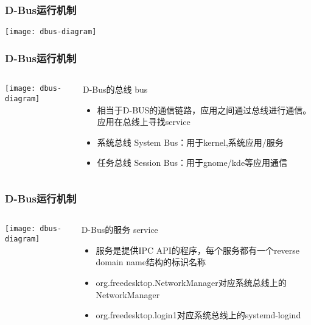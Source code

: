 \begin{frame}[plain]
	\frametitle{D-Bus运行机制}
	\centering
				\texttt{[image: dbus-diagram]}

\end{frame}
\begin{frame}[fragile]
	\frametitle{D-Bus运行机制}
	
	\begin{columns}
		\begin{column}{.4\textwidth}
			
			\texttt{[image: dbus-diagram]}
			
		\end{column}
		\begin{column}{.6\textwidth}
			D-Bus的总线 bus
			\begin{itemize}
				\item 相当于D-BUS的通信链路，应用之间通过总线进行通信。应用在总线上寻找service
				\item 系统总线 System Bus：用于kernel,系统应用/服务
				\item 任务总线 Session Bus：用于gnome/kde等应用通信
				
			\end{itemize}
		\end{column}
	\end{columns}
\end{frame}

\begin{frame}[fragile]
	\frametitle{D-Bus运行机制}
	
	\begin{columns}
		\begin{column}{.4\textwidth}
			
			\texttt{[image: dbus-diagram]}
			
		\end{column}
		\begin{column}{.6\textwidth}
			D-Bus的服务 service
			\begin{itemize}
				\item 服务是提供IPC API的程序，每个服务都有一个reverse domain name结构的标识名称
				\item org.freedesktop.NetworkManager对应系统总线上的NetworkManager
				\item org.freedesktop.login1对应系统总线上的systemd-logind
				
			\end{itemize}
		\end{column}
	\end{columns}
\end{frame}

